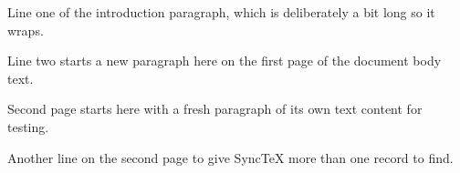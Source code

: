 \documentclass{article}
\begin{document}
Line one of the introduction paragraph, which is deliberately a bit long so it wraps.

Line two starts a new paragraph here on the first page of the document body text.

\newpage
Second page starts here with a fresh paragraph of its own text content for testing.

Another line on the second page to give SyncTeX more than one record to find.
\end{document}
